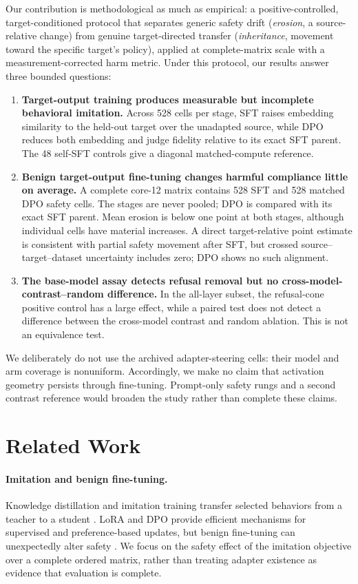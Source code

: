 \documentclass[letterpaper]{article}
\begin{document}
Our contribution is methodological as much as empirical: a positive-controlled,
target-conditioned protocol that separates generic safety drift (\emph{erosion}, a
source-relative change) from genuine target-directed transfer (\emph{inheritance}, movement
toward the specific target's policy), applied at complete-matrix scale with a
measurement-corrected harm metric. Under this protocol, our results answer three bounded
questions:
\begin{enumerate}
\item \textbf{Target-output training produces measurable but incomplete behavioral imitation.}
  Across 528 cells per stage, SFT raises embedding similarity to the held-out target over
  the unadapted source, while DPO reduces both embedding and judge fidelity relative to
  its exact SFT parent. The 48 self-SFT controls give a diagonal matched-compute reference.
\item \textbf{Benign target-output fine-tuning changes harmful compliance little on average.} A complete
  core-12 matrix contains 528 SFT and 528 matched DPO safety cells. The stages are never
  pooled; DPO is compared with its exact SFT parent. Mean erosion is below one
  point at both stages, although individual cells have material increases. A direct
  target-relative point estimate is consistent with partial safety movement after SFT,
  but crossed source--target--dataset uncertainty includes zero; DPO shows no such alignment.
\item \textbf{The base-model assay detects refusal removal but no cross-model-contrast--random
  difference.} In the all-layer subset, the refusal-cone positive control has a
  large effect, while a paired test does not detect a difference between the cross-model contrast and
  random ablation. This is not an equivalence test.
\end{enumerate}

We deliberately do not use the archived adapter-steering cells: their model and arm
coverage is nonuniform. Accordingly, we make no claim that activation geometry persists
through fine-tuning. Prompt-only safety rungs and a second contrast reference would
broaden the study rather than complete these claims.

\section{Related Work}

\paragraph{Imitation and benign fine-tuning.}
Knowledge distillation and imitation training transfer selected behaviors from a
teacher to a student \citep{hinton2015,gudibande2023}. LoRA \citep{hu2022lora} and DPO
\citep{rafailov2023dpo} provide efficient mechanisms for supervised and preference-based
updates, but benign fine-tuning can unexpectedly alter safety \citep{qi2023}. We focus
on the safety effect of the imitation objective over a complete ordered matrix, rather
than treating adapter existence as evidence that evaluation is complete.
\end{document}
